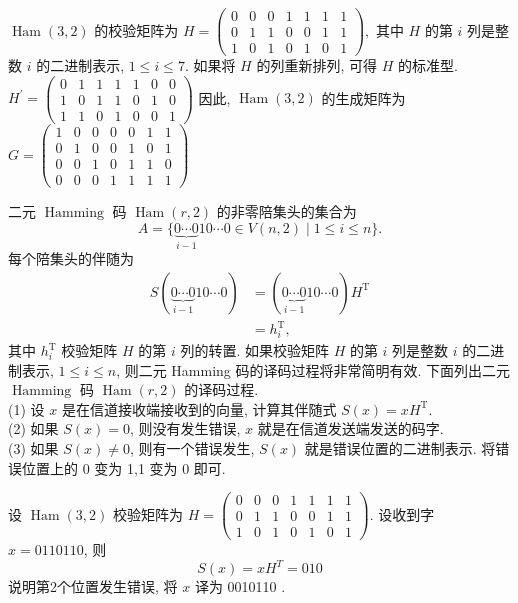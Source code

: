 \begin{example}
 $ \operatorname{Ham}(3,2) $ 的校验矩阵为
$
H=\left(\begin{array}{lllllll}
0 & 0 & 0 & 1 & 1 & 1 & 1 \\
0 & 1 & 1 & 0 & 0 & 1 & 1 \\
1 & 0 & 1 & 0 & 1 & 0 & 1
\end{array}\right),
$
其中 $ H $ 的第 $ i $ 列是整数 $ i $ 的二进制表示, $ 1 \leqslant i \leqslant 7 $. 如果将 $ H $ 的列重新排列, 可得 $ H $ 的标准型.
$
H^{\prime}=\left(\begin{array}{lllllll}
0 & 1 & 1 & 1 & 1 & 0 & 0 \\
1 & 0 & 1 & 1 & 0 & 1 & 0 \\
1 & 1 & 0 & 1 & 0 & 0 & 1
\end{array}\right)
$
因此, $ \operatorname{Ham}(3,2) $ 的生成矩阵为 $ G=\left(\begin{array}{lllllll}1 & 0 & 0 & 0 & 0 & 1 & 1 \\ 0 & 1 & 0 & 0 & 1 & 0 & 1 \\ 0 & 0 & 1 & 0 & 1 & 1 & 0 \\ 0 & 0 & 0 & 1 & 1 & 1 & 1\end{array}\right) $
\end{example}

二元 $ \operatorname{Hamming} $ 码 $ \operatorname{Ham}(r, 2) $ 的非零陪集头的集合为
$$
A=\{\underbrace{0 \cdots 0}_{i-1} 10 \cdots 0 \in V(n, 2) \mid 1 \leqslant i \leqslant n\} .
$$
每个陪集头的伴随为
$$
\begin{aligned}
S(\underbrace{0 \cdots 0}_{i-1} 10 \cdots 0) & =(\underbrace{0 \cdots 0}_{i-1} 10 \cdots 0) H^{\mathrm{T}} \\
& =h_{i}^{\mathrm{T}},
\end{aligned}
$$
其中 $ h_{i}^{\mathrm{T}} $ 校验矩阵 $ H $ 的第 $ i $ 列的转置.
如果校验矩阵 $ H $ 的第 $ i $ 列是整数 $ i $ 的二进制表示, $ 1 \leqslant i \leqslant n $, 则二元 Hamming 码的译码过程将非常简明有效. 下面列出二元 $ \operatorname{Hamming} $ 码 $ \operatorname{Ham}(r, 2) $ 的译码过程.\\
(1) 设 $ x $ 是在信道接收端接收到的向量, 计算其伴随式 $ S(x)=x H^{\mathrm{T}} $.\\
(2) 如果 $ S(x)=0 $, 则没有发生错误, $ x $ 就是在信道发送端发送的码字.\\
(3) 如果 $ S(x) \neq 0 $, 则有一个错误发生, $ S(x) $ 就是错误位置的二进制表示. 将错误位置上的 0 变为 1,1 变为 0 即可.

\begin{example}
设 $ \operatorname{Ham}(3,2) $ 校验矩阵为 $ H=\left(\begin{array}{lllllll}0 & 0 & 0 & 1 & 1 & 1 & 1 \\ 0 & 1 & 1 & 0 & 0 & 1 & 1 \\ 1 & 0 & 1 & 0 & 1 & 0 & 1\end{array}\right) $. 设收到字 $ x=0110110 $, 则
$$
S(x)=x H^{T}=010
$$
说明第2个位置发生错误, 将 $x$ 译为 0010110 .
\end{example}


